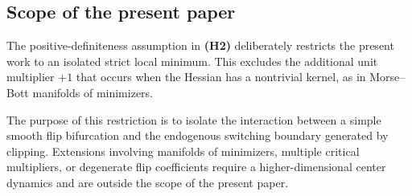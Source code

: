 \subsection{Scope of the present paper}
\label{subsec:scope}

The positive-definiteness assumption in \textbf{(H2)} deliberately
restricts the present work to an isolated strict local minimum.
This excludes the additional unit multiplier $+1$ that occurs when
the Hessian has a nontrivial kernel, as in Morse--Bott manifolds of
minimizers.

The purpose of this restriction is to isolate the interaction between
a simple smooth flip bifurcation and the endogenous switching
boundary generated by clipping.  Extensions involving manifolds of
minimizers, multiple critical multipliers, or degenerate flip
coefficients require a higher-dimensional center dynamics and are
outside the scope of the present paper.

